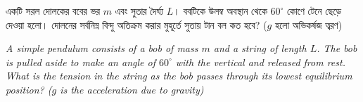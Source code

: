 \documentclass[12pt, a4paper]{article}
\begin{document}
\newpage

\begin{tcolorbox}[questionbox={প্রশ্ন (Question) 30}]
    \noindent
    একটি সরল দোলকের ববের ভর $m$ এবং সুতার দৈর্ঘ্য $L$। ববটিকে উলম্ব অবস্থান থেকে $60^\circ$ কোণে টেনে ছেড়ে দেওয়া হলো। দোলনের সর্বনিম্ন বিন্দু অতিক্রম করার মুহূর্তে সুতায় টান বল কত হবে? ($g$ হলো অভিকর্ষজ ত্বরণ)
    
    \vspace{0.8em}
    \begin{english}
    \noindent\textit{\color{darkgray}
    A simple pendulum consists of a bob of mass $m$ and a string of length $L$. The bob is pulled aside to make an angle of $60^\circ$ with the vertical and released from rest. What is the tension in the string as the bob passes through its lowest equilibrium position? ($g$ is the acceleration due to gravity)
    }
    \end{english}
\end{tcolorbox}
\end{document}
